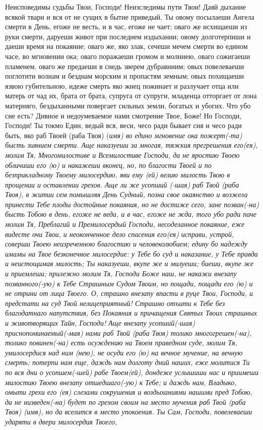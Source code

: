  


Неисповедимы судьбы Твои, Господи! Неизследимы пути Твои! Даяй дыхание всякой твари и вся от не сущих в бытие приведый, Ты овому посылаеши Ангела смерти в День, егоже не весть, и в час, егоже не чает; оваго же исхищаеши из руки смерти, даруеши живот при последнем издыхании; овому долготерпиши и даеши время на покаяние; оваго же, яко злак, сечеши мечем смерти во едином часе, во мгновении ока; оваго поражаеши громом и молниею, оваго сожигаеши пламенем, оваго же предаеши в снедь зверем дубравниим; овых повелеваеши поглотити волнам и безднам морским и пропастям земным; овых похищаеши язвою губительною, идеже смерть яко жнец пожинает и разлучает отца или матерь от чад их, брата от брата, супруга от супруги, младенца отторгает от лона матерняго, бездыханными повергает сильных земли, богатых и убогих. Что убо сие есть? Дивное и недоумеваемое нами смотрение Твое, Боже! Но Господи, Господи! Ты токмо Един, ведый вся, веси, чесо ради бывает сия и чесо ради быть, яко раб Твоей (раба Твоя) (\itshape имя\normalfont{}) во едино мгновение ока пожерт(-та) бысть зиянием смерти. Аще наказуеши за многая, тяжкия прегрешения его(ея), молим Тя, Многомилостиве и Всемилостиве Господи, да не яростию Твоею обличиши его (ю) и накажеши вконец, но, по благости Твоей и по безприкладному Твоему милосердию, яви ему (ей) велию милость Твою в прощении и оставлении грехов. Аще ли же усопший (-шая) раб Твой (раба Твоя), в житии сем помышляя День Судный, позна свое окаянство и возжела принести Тебе плоды достойные покаяния, но не достиже сего, зане позван(-на) бысть Тобою в день, егоже не веда, и в час, егоже не жда, того убо ради паче молим Тя, Преблагий и Премилосердый Господи, несоделанное покаяние, еже видесте очи Твои, и неоконченное дело спасения его(ея) исправи, устрой, соверши Твоею неизреченною благостию и человеколюбием; едину бо надежду имамы на Твое безконечное милосердие: у Тебе бо суд и наказание, у Тебе правда и неистощимая милость; Ты наказуеши, вкупе же и милуеши; биеши, вкупе же и приемлеши; прилежно молим Тя, Господи Боже наш, не накажи внезапу позванного(-ую) к Тебе Страшным Судом Твоим, но пощади, пощади его (ю) и не отрини от лица Твоего. О, страшно внезапу впасти в руце Твои, Господи, и предстати на суд Твой нелицеприятный! Страшно отъити к Тебе без благодатнаго напутствия, без Покаяния и причащения Святых Твоих страшных и животворящих Тайн, Господи! Аще внезапу усопший(-шая) приснопоминаемый(-мая) нами раб Твой (раба Твоя) толико многогрешен(-на), толико повинен(-на) есть осуждению на Твоем праведном суде, молим Тя, умилосердися над ним (нею), не осуди его (ю) на вечное мучение, на вечную смерть; потерпи нам еще, даждь нам долготу дний наших, еже молитися Ти по вся дни о усопшем(-шей) рабе Твоем(ей), дондеже услышиши нас и приимеши милостию Твоею внезапу отшедшаго(-ую) к Тебе; и даждь нам, Владыко, омыти грехи его (ея) слезами сокрушения и воздыханиями нашими пред Тобою, да не низведен(-на) будет по грехом своим на место мучения раб Твой (раба Твоя) (имя), но да вселится в место упокоения. Ты Сам, Господи, повелеваеши ударяти в двери милосердия Твоего, 